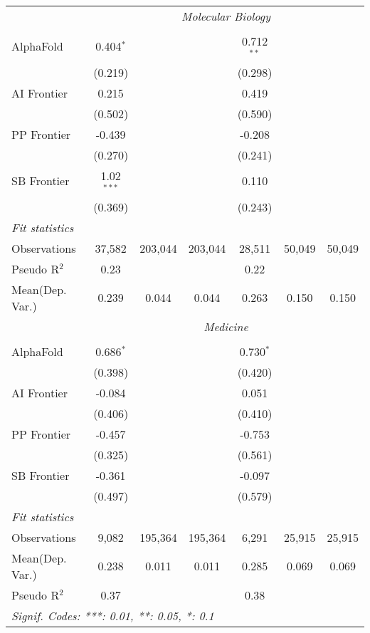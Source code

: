 \begin{tabular}{lcccccc}
 & \multicolumn{6}{c}{\textit{Molecular Biology}} \\ \\
   AlphaFold    & 0.404$^{*}$  &         &         & 0.712$^{**}$ &        &   \\   
                & (0.219)      &         &         & (0.298)      &        &   \\   
   AI Frontier  & 0.215        &         &         & 0.419        &        &   \\   
                & (0.502)      &         &         & (0.590)      &        &   \\   
   PP Frontier  & -0.439       &         &         & -0.208       &        &   \\   
                & (0.270)      &         &         & (0.241)      &        &   \\   
   SB Frontier  & 1.02$^{***}$ &         &         & 0.110        &        &   \\   
                & (0.369)      &         &         & (0.243)      &        &   \\   
   \midrule
   \emph{Fit statistics}\\
   Observations & 37,582       & 203,044 & 203,044 & 28,511       & 50,049 & 50,049\\  
   Pseudo R$^2$ & 0.23         &         &         & 0.22         &        & \\  
   
Mean(Dep. Var.) & 0.239 & 0.044 & 0.044 & 0.263 & 0.150 & 0.150 \\
 & \multicolumn{6}{c}{\textit{Medicine}} \\ \\
   AlphaFold    & 0.686$^{*}$ &         &         & 0.730$^{*}$ &        &   \\   
                & (0.398)     &         &         & (0.420)     &        &   \\   
   AI Frontier  & -0.084      &         &         & 0.051       &        &   \\   
                & (0.406)     &         &         & (0.410)     &        &   \\   
   PP Frontier  & -0.457      &         &         & -0.753      &        &   \\   
                & (0.325)     &         &         & (0.561)     &        &   \\   
   SB Frontier  & -0.361      &         &         & -0.097      &        &   \\   
                & (0.497)     &         &         & (0.579)     &        &   \\   
   \midrule
   \emph{Fit statistics}\\
   Observations & 9,082       & 195,364 & 195,364 & 6,291       & 25,915 & 25,915\\  
Mean(Dep. Var.) & 0.238 & 0.011 & 0.011 & 0.285 & 0.069 & 0.069 \\
   Pseudo R$^2$ & 0.37        &         &         & 0.38        &        & \\  
   \midrule \midrule
   \multicolumn{7}{l}{\emph{Signif. Codes: ***: 0.01, **: 0.05, *: 0.1}}\\
\end{tabular}
\par\endgroup
